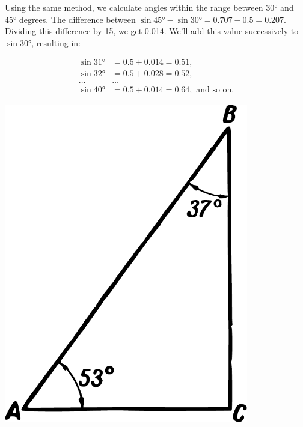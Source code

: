 Using the same method, we calculate angles within the range between \ang{30} and \ang{45} degrees. The difference between $\sin \ang{45} - \sin \ang{30} = 0.707 - 0.5 = 0.207$. Dividing this difference by 15, we get 0.014. We'll add this value successively to $\sin \ang{30}$, resulting in:
\begin{small}
\begin{align*}%
\sin \ang{31}  & = 0.5 + 0.014 = 0.51,\\
\sin \ang{32}  & = 0.5 + 0.028 = 0.52,\\
\ldots & \ldots \\
\sin \ang{40}  & = 0.5 + 0.014 = 0.64,\,\,\text{and so on.}
\end{align*}
\end{small}
\begin{marginfigure}[-4cm]
\centering
\includegraphics[width=0.8\textwidth]{figures/ch-05/fig-090.pdf}
\end{marginfigure}
